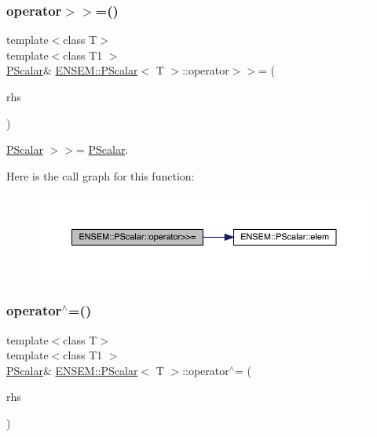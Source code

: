 \subsubsection{\texorpdfstring{operator$>$$>$=()}{operator>>=()}\hspace{0.1cm}{\footnotesize\ttfamily [2/2]}}
{\footnotesize\ttfamily template$<$class T$>$ \\
template$<$class T1 $>$ \\
\mbox{\hyperlink{classENSEM_1_1PScalar}{P\+Scalar}}\& \mbox{\hyperlink{classENSEM_1_1PScalar}{E\+N\+S\+E\+M\+::\+P\+Scalar}}$<$ T $>$\+::operator$>$$>$= (\begin{DoxyParamCaption}\item[{const \mbox{\hyperlink{classENSEM_1_1PScalar}{P\+Scalar}}$<$ T1 $>$ \&}]{rhs }\end{DoxyParamCaption})\hspace{0.3cm}{\ttfamily [inline]}}



\mbox{\hyperlink{classENSEM_1_1PScalar}{P\+Scalar}} $>$$>$= \mbox{\hyperlink{classENSEM_1_1PScalar}{P\+Scalar}}. 

Here is the call graph for this function\+:
\nopagebreak
\begin{figure}[H]
\begin{center}
\leavevmode
\includegraphics[width=350pt]{d3/d27/classENSEM_1_1PScalar_a8fe07cd0462ddff9e3d0858ebe29e77c_cgraph}
\end{center}
\end{figure}
\mbox{\label{classENSEM_1_1PScalar_a3f256371cc925f01209559addfcbb632}} 
\subsubsection{\texorpdfstring{operator$^\wedge$=()}{operator^=()}\hspace{0.1cm}{\footnotesize\ttfamily [1/2]}}
{\footnotesize\ttfamily template$<$class T$>$ \\
template$<$class T1 $>$ \\
\mbox{\hyperlink{classENSEM_1_1PScalar}{P\+Scalar}}\& \mbox{\hyperlink{classENSEM_1_1PScalar}{E\+N\+S\+E\+M\+::\+P\+Scalar}}$<$ T $>$\+::operator$^\wedge$= (\begin{DoxyParamCaption}\item[{const \mbox{\hyperlink{classENSEM_1_1PScalar}{P\+Scalar}}$<$ T1 $>$ \&}]{rhs }\end{DoxyParamCaption})\hspace{0.3cm}{\ttfamily [inline]}}



